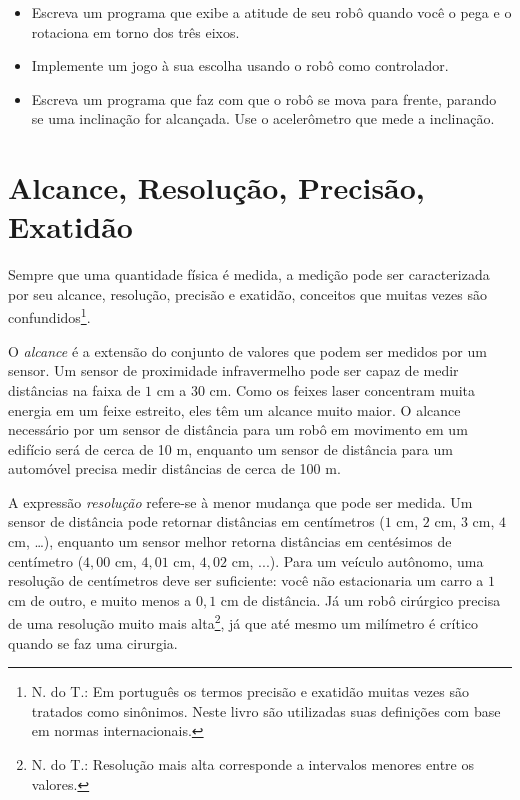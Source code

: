 \begin{framed}

\begin{itemize}
\item Escreva um programa que exibe a atitude de seu robô quando você o pega e o rotaciona em torno dos três eixos.

\item Implemente um jogo à sua escolha usando o robô como controlador.

\item Escreva um programa que faz com que o robô se mova para frente, parando se uma inclinação for alcançada. Use o acelerômetro que mede a inclinação.
\end{itemize}
\end{framed}

\section{Alcance, Resolução, Precisão, Exatidão}\label{s.range}

Sempre que uma quantidade física é medida, a medição pode ser caracterizada por seu alcance, resolução, precisão e exatidão, conceitos que muitas vezes são confundidos\footnote{N. do T.: Em português os termos precisão e exatidão muitas vezes são tratados como sinônimos. Neste livro são utilizadas suas definições com base em normas internacionais.}.

O \emph{alcance} é a extensão do conjunto de valores que podem ser medidos por um sensor. Um sensor de proximidade infravermelho pode ser capaz de medir distâncias na faixa de $1$ cm a $30$ cm. Como os feixes laser concentram muita energia em um feixe estreito, eles têm um alcance muito maior. O alcance necessário por um sensor de distância para um robô em movimento em um edifício será de cerca de 10 m, enquanto um sensor de distância para um automóvel precisa medir distâncias de cerca de 100 m.

A expressão \emph{resolução} refere-se à menor mudança que pode ser medida. Um sensor de distância pode retornar distâncias em centímetros ($1$ cm, $2$ cm, $3$ cm, $4$ cm, \ldots), enquanto um sensor melhor retorna distâncias em centésimos de centímetro ($4,00$ cm, $4,01$ cm, $4,02$ cm, ...). Para um veículo autônomo, uma resolução de centímetros deve ser suficiente: você não estacionaria um carro a $1$ cm de outro, e muito menos a $0,1$ cm de distância. Já um robô cirúrgico precisa de uma resolução muito mais alta\footnote{N. do T.: Resolução mais alta corresponde a intervalos menores entre os valores.}, já que até mesmo um milímetro é crítico quando se faz uma cirurgia.

